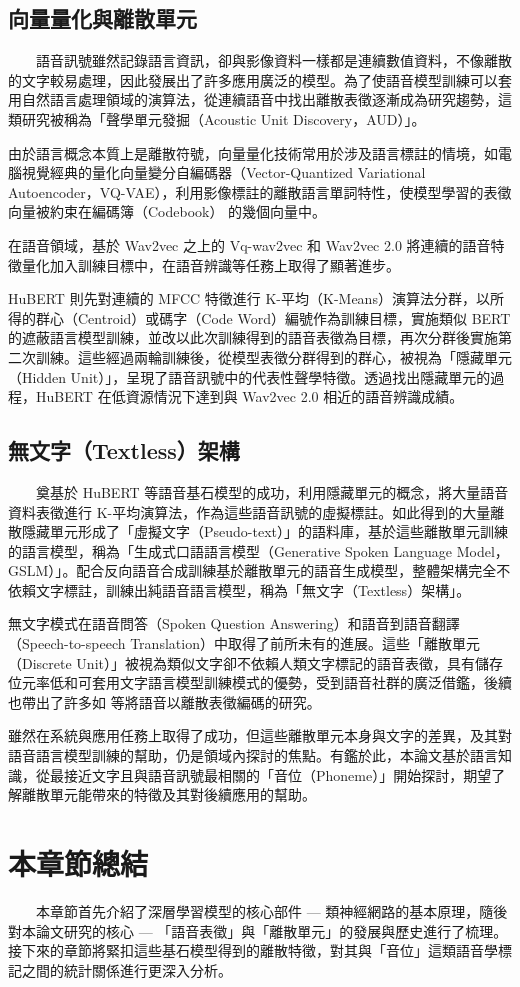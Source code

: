 \subsection{向量量化與離散單元}

　　語音訊號雖然記錄語言資訊，卻與影像資料一樣都是連續數值資料，不像離散的文字較易處理，因此發展出了許多應用廣泛的模型。為了使語音模型訓練可以套用自然語言處理領域的演算法，從連續語音中找出離散表徵逐漸成為研究趨勢，這類研究被稱為「聲學單元發掘（Acoustic Unit Discovery，AUD）」。

        由於語言概念本質上是離散符號，向量量化技術常用於涉及語言標註的情境，如電腦視覺經典的量化向量變分自編碼器（Vector-Quantized Variational Autoencoder，VQ-VAE）\cite{van2017neural}，利用影像標註的離散語言單詞特性，使模型學習的表徵向量被約束在編碼簿（Codebook） 的幾個向量中。

        在語音領域，基於 Wav2vec 之上的 Vq-wav2vec \cite{baevski2019vq} 和 Wav2vec 2.0 將連續的語音特徵量化加入訓練目標中，在語音辨識等任務上取得了顯著進步。

        HuBERT \cite{hsu_hubert_2021-2} 則先對連續的 MFCC 特徵進行 K-平均（K-Means）演算法分群，以所得的群心（Centroid）或碼字（Code Word）編號作為訓練目標，實施類似 BERT 的遮蔽語言模型訓練，並改以此次訓練得到的語音表徵為目標，再次分群後實施第二次訓練。這些經過兩輪訓練後，從模型表徵分群得到的群心，被視為「隱藏單元（Hidden Unit）」，呈現了語音訊號中的代表性聲學特徵。透過找出隱藏單元的過程，HuBERT 在低資源情況下達到與 Wav2vec 2.0 相近的語音辨識成績。

\subsection{無文字（Textless）架構}

　　奠基於 HuBERT 等語音基石模型的成功，利用隱藏單元的概念，將大量語音資料表徵進行 K-平均演算法，作為這些語音訊號的虛擬標註。如此得到的大量離散隱藏單元形成了「虛擬文字（Pseudo-text）」的語料庫，基於這些離散單元訓練的語言模型，稱為「生成式口語語言模型（Generative Spoken Language Model，GSLM）」\cite{lakhotia_generative_2021-1}。配合反向語音合成訓練基於離散單元的語音生成模型，整體架構完全不依賴文字標註，訓練出純語音語言模型，稱為「無文字（Textless）架構」\cite{noauthor_textless_2021}。

        無文字模式在語音問答（Spoken Question Answering）\cite{lin2022dual}和語音到語音翻譯 （Speech-to-speech Translation）\cite{chen_speech--speech_2023}中取得了前所未有的進展。這些「離散單元（Discrete Unit）」被視為類似文字卻不依賴人類文字標記的語音表徵，具有儲存位元率低和可套用文字語言模型訓練模式的優勢，受到語音社群的廣泛借鑑，後續也帶出了許多如\cite{zhang2024speechtokenizer} 等將語音以離散表徵編碼的研究。

        雖然在系統與應用任務上取得了成功，但這些離散單元本身與文字的差異，及其對語音語言模型訓練的幫助，仍是領域內探討的焦點。有鑑於此，本論文基於語言知識，從最接近文字且與語音訊號最相關的「音位（Phoneme）」開始探討，期望了解離散單元能帶來的特徵及其對後續應用的幫助。

\section{本章節總結}

　　本章節首先介紹了深層學習模型的核心部件 --- 類神經網路的基本原理，隨後對本論文研究的核心 --- 「語音表徵」與「離散單元」的發展與歷史進行了梳理。接下來的章節將緊扣這些基石模型得到的離散特徵，對其與「音位」這類語音學標記之間的統計關係進行更深入分析。
